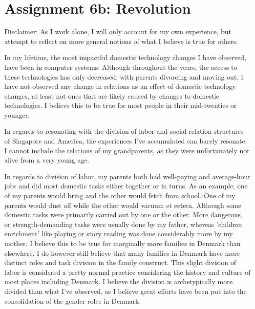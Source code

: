 \section*{Assignment 6b: Revolution} 
Disclaimer: As I work alone, I will only account for my own experience, but attempt to reflect on more general notions of what I believe is true for others. 

In my lifetime, the most impactful domestic technology changes I have observed, have been in computer systems.
Although throughout the years, the access to these technologies has only decreased, with parents divorcing and moving out.
I have not observed any change in relations as an effect of domestic technology changes, at least not ones that are likely caused by changes to domestic technologies.
I believe this to be true for most people in their mid-twenties or younger.

In regards to resonating with the division of labor and social relation structures of Singapore and America, the experiences I've accumulated can barely resonate.
I cannot include the relations of my grandparents, as they were unfortunately not alive from a very young age.

In regards to division of labor, my parents both had well-paying and average-hour jobs and did most domestic tasks either together or in turns.
As an example, one of my parents would bring and the other would fetch from school.
One of my parents would dust off while the other would vacuum et cetera.
Although some domestic tasks were primarily carried out by one or the other. 
More dangerous, or strength-demanding tasks were usually done by my father, whereas 'children enrichment' like playing or story reading was done considerably more by my mother.
I believe this to be true for marginally more families in Denmark than elsewhere.
I do however still believe that many families in Denmark have more distinct roles and task division in the family construct.
This slight division of labor is considered a pretty normal practice considering the history and culture of most places including Denmark.
I believe the division is archetypically more divided than what I've observed, as I believe great efforts have been put into the consolidation of the gender roles in Denmark. 


